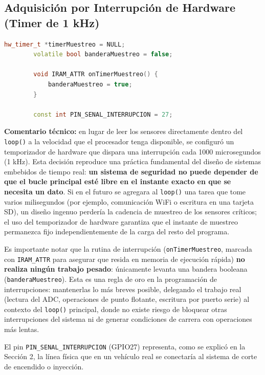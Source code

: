\documentclass[12pt, letterpaper]{article}
\begin{document}
	\subsection{Adquisición por Interrupción de Hardware (Timer de 1 kHz)}
	\begin{lstlisting}[language=C++]
		hw_timer_t *timerMuestreo = NULL;
		volatile bool banderaMuestreo = false;
		
		void IRAM_ATTR onTimerMuestreo() {
			banderaMuestreo = true;
		}
		
		const int PIN_SENAL_INTERRUPCION = 27;
	\end{lstlisting}
	\textbf{Comentario técnico:} en lugar de leer los sensores directamente dentro del \texttt{loop()} a la velocidad que el procesador tenga disponible, se configuró un temporizador de hardware que dispara una interrupción cada 1000 microsegundos (1 kHz). Esta decisión reproduce una práctica fundamental del diseño de sistemas embebidos de tiempo real: \textbf{un sistema de seguridad no puede depender de que el bucle principal esté libre en el instante exacto en que se necesita un dato}. Si en el futuro se agregara al \texttt{loop()} una tarea que tome varios milisegundos (por ejemplo, comunicación WiFi o escritura en una tarjeta SD), un diseño ingenuo perdería la cadencia de muestreo de los sensores críticos; el uso del temporizador de hardware garantiza que el instante de muestreo permanezca fijo independientemente de la carga del resto del programa.
	
	Es importante notar que la rutina de interrupción (\texttt{onTimerMuestreo}, marcada con \texttt{IRAM\_ATTR} para asegurar que resida en memoria de ejecución rápida) \textbf{no realiza ningún trabajo pesado}: únicamente levanta una bandera booleana (\texttt{banderaMuestreo}). Esta es una regla de oro en la programación de interrupciones: mantenerlas lo más breves posible, delegando el trabajo real (lectura del ADC, operaciones de punto flotante, escritura por puerto serie) al contexto del \texttt{loop()} principal, donde no existe riesgo de bloquear otras interrupciones del sistema ni de generar condiciones de carrera con operaciones más lentas.
	
	El pin \texttt{PIN\_SENAL\_INTERRUPCION} (GPIO27) representa, como se explicó en la Sección 2, la línea física que en un vehículo real se conectaría al sistema de corte de encendido o inyección.
	
\end{document}
